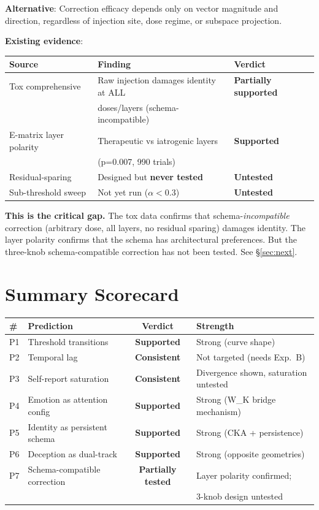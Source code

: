 \documentclass[11pt,letterpaper]{article}
\begin{document}
\textbf{Alternative}: Correction efficacy depends only on vector
magnitude and direction, regardless of injection site, dose regime,
or subspace projection.

\textbf{Existing evidence}:

\begin{table}[H]
\centering
\begin{tabular}{lll}
\toprule
Source & Finding & Verdict \\
\midrule
Tox comprehensive & Raw injection damages identity at ALL &
  \textbf{Partially supported} \\
 & doses/layers (schema-incompatible) & \\
E-matrix layer polarity & Therapeutic vs iatrogenic layers &
  \textbf{Supported} \\
 & (p=0.007, 990 trials) & \\
Residual-sparing & Designed but \textbf{never tested} &
  \textbf{Untested} \\
Sub-threshold sweep & Not yet run ($\alpha < 0.3$) &
  \textbf{Untested} \\
\bottomrule
\end{tabular}
\end{table}

\textbf{This is the critical gap.} The tox data confirms that
schema-\emph{incompatible} correction (arbitrary dose, all layers,
no residual sparing) damages identity. The layer polarity confirms
that the schema has architectural preferences. But the three-knob
schema-compatible correction has not been tested. See \S\ref{sec:next}.

\section{Summary Scorecard}

\begin{table}[H]
\centering
\begin{tabular}{llcl}
\toprule
\# & Prediction & Verdict & Strength \\
\midrule
P1 & Threshold transitions & \textbf{Supported} &
  Strong (curve shape) \\
P2 & Temporal lag & \textbf{Consistent} &
  Not targeted (needs Exp.~B) \\
P3 & Self-report saturation & \textbf{Consistent} &
  Divergence shown, saturation untested \\
P4 & Emotion as attention config & \textbf{Supported} &
  Strong (W\_K bridge mechanism) \\
P5 & Identity as persistent schema & \textbf{Supported} &
  Strong (CKA + persistence) \\
P6 & Deception as dual-track & \textbf{Supported} &
  Strong (opposite geometries) \\
P7 & Schema-compatible correction & \textbf{Partially tested} &
  Layer polarity confirmed; \\
 & & & 3-knob design untested \\
\bottomrule
\end{tabular}
\end{table}
\end{document}
